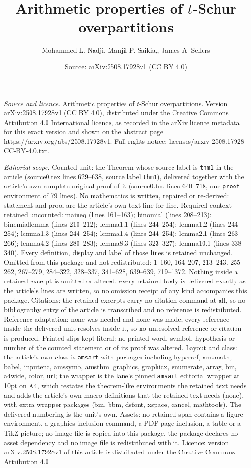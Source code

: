 \documentclass[10pt,a4paper]{amsart}
\title[Arithmetic properties of $t$-Schur overpartitions]{Arithmetic properties of $t$-Schur overpartitions}
\author{Mohammed L. Nadji, Manjil P. Saikia,, James A. Sellers}
\date{Source: arXiv:2508.17928v1 (CC BY 4.0)}
\begin{document}
\maketitle

\noindent\emph{Source and licence.} Arithmetic properties of $t$-Schur overpartitions. Version arXiv:2508.17928v1 (CC BY 4.0), distributed under the Creative Commons Attribution 4.0 International licence, as recorded in the arXiv licence metadata for this exact version and shown on the abstract page https://arxiv.org/abs/2508.17928v1. Full rights notice: licenses/arxiv-2508.17928-CC-BY-4.0.txt.\par\smallskip

\noindent\textit{Editorial scope.} Counted unit: the Theorem whose source label is \texttt{thm1} in the article (source0.tex lines 629--638, source label \texttt{thm1}), delivered together with the article's own complete original proof of it (source0.tex lines 640--718, one \texttt{proof} environment of 79 lines). No mathematics is written, repaired or re-derived: statement and proof are the article's own text line for line. Required context retained uncounted: maineq (lines 161--163); binomial (lines 208--213); binomiallemma (lines 210--212); lemma1.1 (lines 244--254); lemma1.2 (lines 244--254); lemma1.3 (lines 244--254); lemma1.4 (lines 244--254); lemma2.1 (lines 263--266); lemma4.2 (lines 280--283); lemma8.3 (lines 323--327); lemma10.1 (lines 338--340). Every definition, display and label of those lines is retained unchanged. Omitted from this package and not redistributed: 1--160, 164--207, 213--243, 255--262, 267--279, 284--322, 328--337, 341--628, 639--639, 719--1372. Nothing inside a retained excerpt is omitted or altered: every retained body is delivered exactly as the article's lines are written, so no omission receipt of any kind accompanies this package. Citations: the retained excerpts carry no citation command at all, so no bibliography entry of the article is transcribed and no reference is redistributed. Reference adaptation: none was needed and none was made; every reference inside the delivered unit resolves inside it, so no unresolved reference or citation is produced. Printed slips kept literal: no printed word, symbol, hypothesis or number of the counted statement or of its proof was altered. Layout and class: the article's own class is \texttt{amsart} with packages including hyperref, amsmath, babel, inputenc, amssymb, amsthm, graphics, graphicx, enumerate, array, bm, a4wide, color, url; the wrapper is the lane's pinned \texttt{amsart} editorial wrapper at 10pt on A4, which restates the theorem-like environments the retained text needs and adds the article's own macro definitions that the retained text needs (none), with extra wrapper packages (bm, bbm, dsfont, xspace, cancel, mathtools). The delivered numbering is the unit's own. Assets: no retained span contains a figure environment, a graphics-inclusion command, a PDF-page inclusion, a table or a TikZ picture; no image file is copied into this package, the package declares no asset dependency and no image file is redistributed with it. Licence: version arXiv:2508.17928v1 of this article is distributed under the Creative Commons Attribution 4.0 
\end{document}
